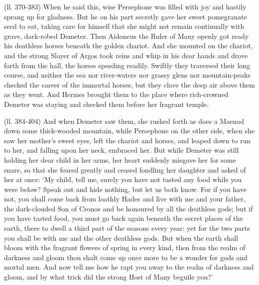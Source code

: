 (ll. 370-383) When he said this, wise Persephone was filled with joy and
hastily sprang up for gladness. But he on his part secretly gave her sweet
pomegranate seed to eat, taking care for himself that she might not remain
continually with grave, dark-robed Demeter. Then Aidoneus the Ruler of Many
openly got ready his deathless horses beneath the golden chariot. And she
mounted on the chariot, and the strong Slayer of Argos took reins and whip in
his dear hands and drove forth from the hall, the horses speeding readily.
Swiftly they traversed their long course, and neither the sea nor river-waters
nor grassy glens nor mountain-peaks checked the career of the immortal horses,
but they clave the deep air above them as they went. And Hermes brought them to
the place where rich-crowned Demeter was staying and checked them before her
fragrant temple.

(ll. 384-404) And when Demeter saw them, she rushed forth as does a Maenad down
some thick-wooded mountain, while Persephone on the other side, when she saw
her mother’s sweet eyes, left the chariot and horses, and leaped down to
run to her, and falling upon her neck, embraced her. But while Demeter was
still holding her dear child in her arms, her heart suddenly misgave her for
some snare, so that she feared greatly and ceased fondling her daughter and
asked of her at once: ‘My child, tell me, surely you have not tasted any
food while you were below? Speak out and hide nothing, but let us both know.
For if you have not, you shall come back from loathly Hades and live with me
and your father, the dark-clouded Son of Cronos and be honoured by all the
deathless gods; but if you have tasted food, you must go back again beneath the
secret places of the earth, there to dwell a third part of the seasons every
year: yet for the two parts you shall be with me and the other deathless gods.
But when the earth shall bloom with the fragrant flowers of spring in every
kind, then from the realm of darkness and gloom thou shalt come up once more to
be a wonder for gods and mortal men. And now tell me how he rapt you away to
the realm of darkness and gloom, and by what trick did the strong Host of Many
beguile you?’

